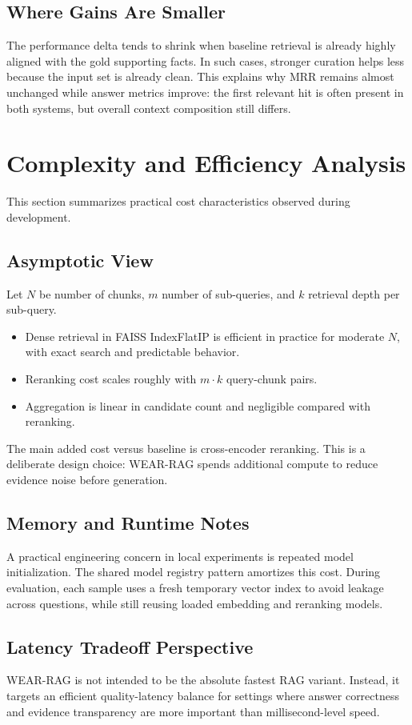 \documentclass[10pt,draftclsnofoot,onecolumn,journal]{IEEEtran}
\begin{document}
\subsection{Where Gains Are Smaller}
The performance delta tends to shrink when baseline retrieval is already highly aligned with the gold supporting facts. In such cases, stronger curation helps less because the input set is already clean. This explains why MRR remains almost unchanged while answer metrics improve: the first relevant hit is often present in both systems, but overall context composition still differs.

\section{Complexity and Efficiency Analysis}
This section summarizes practical cost characteristics observed during development.

\subsection{Asymptotic View}
Let $N$ be number of chunks, $m$ number of sub-queries, and $k$ retrieval depth per sub-query.
\begin{itemize}
\item Dense retrieval in FAISS IndexFlatIP is efficient in practice for moderate $N$, with exact search and predictable behavior.
\item Reranking cost scales roughly with $m \cdot k$ query-chunk pairs.
\item Aggregation is linear in candidate count and negligible compared with reranking.
\end{itemize}

The main added cost versus baseline is cross-encoder reranking. This is a deliberate design choice: WEAR-RAG spends additional compute to reduce evidence noise before generation.

\subsection{Memory and Runtime Notes}
A practical engineering concern in local experiments is repeated model initialization. The shared model registry pattern amortizes this cost. During evaluation, each sample uses a fresh temporary vector index to avoid leakage across questions, while still reusing loaded embedding and reranking models.

\subsection{Latency Tradeoff Perspective}
WEAR-RAG is not intended to be the absolute fastest RAG variant. Instead, it targets an efficient quality-latency balance for settings where answer correctness and evidence transparency are more important than millisecond-level speed.
\end{document}
